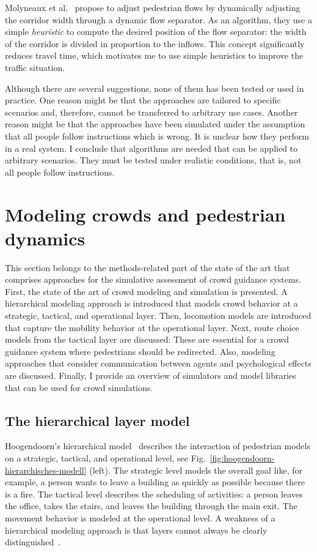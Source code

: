Molyneaux et al.~\cite{molyneaux-2020-cdyn} propose to adjust pedestrian flows by dynamically adjusting the corridor width through a dynamic flow separator. As an algorithm, they use a simple \textit{heuristic} to compute the desired position of the flow separator: the width of the corridor is divided in proportion to the inflows. This concept significantly reduces travel time, which motivates me to use simple heuristics to improve the traffic situation. 

Although there are several suggestions, none of them has been tested or used in practice. One reason might be that the approaches are tailored to specific scenarios and, therefore, cannot be transferred to arbitrary use cases. Another reason might be that the approaches have been simulated under the assumption that all people follow instructions which is wrong. It is unclear how they perform in a real system. I conclude that algorithms are needed that can be applied to arbitrary scenarios. They must be tested under realistic conditions, that is, not all people follow instructions.



\section{Modeling crowds and pedestrian dynamics}
\label{sec:modelcrowd}

This section belongs to the methods-related part of the state of the art that comprises approaches for the simulative assessment of crowd guidance systems. First, the state of the art of crowd modeling and simulation is presented. A hierarchical modeling approach is introduced that models crowd behavior at a strategic, tactical, and operational layer. Then, locomotion models are introduced that capture the mobility behavior at the operational layer. Next, route choice models from the tactical layer are discussed: These are essential for a crowd guidance system where pedestrians should be redirected. Also, modeling approaches that consider communication between agents and psychological effects are discussed. Finally, I provide an overview of simulators and model libraries that can be used for crowd simulations.




\subsection{The hierarchical layer model}
Hoogendoorn's hierarchical model~\cite{hoogendoorn-2004-cdyn} describes the interaction of pedestrian models on a strategic, tactical, and operational level, see Fig.~\ref{fig:hoogendoorn-hierarchisches-modell} (left). 
The strategic level models the overall goal like, for example, a person wants to leave a building as quickly as possible because there is a fire. The tactical level describes the scheduling of activities: a person leaves the office, takes the stairs, and leaves the building through the main exit. The movement behavior is modeled at the operational level.
A weakness of a hierarchical modeling approach is that layers cannot always be clearly distinguished~\cite{zoennchen-2021-cdyn}.

